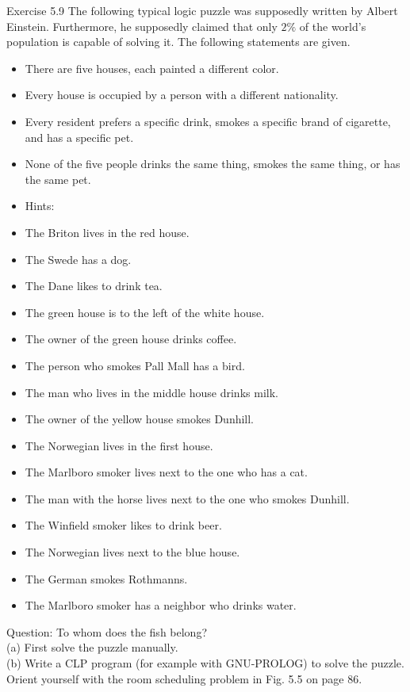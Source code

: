 \documentclass[10pt]{book}
\begin{document}
Exercise 5.9 The following typical logic puzzle was supposedly written by Albert Einstein. Furthermore, he supposedly claimed that only $2 \%$ of the world's population is capable of solving it. The following statements are given.

\begin{itemize}
  \item There are five houses, each painted a different color.
  \item Every house is occupied by a person with a different nationality.
  \item Every resident prefers a specific drink, smokes a specific brand of cigarette, and has a specific pet.
  \item None of the five people drinks the same thing, smokes the same thing, or has the same pet.
  \item Hints:
  \item The Briton lives in the red house.
  \item The Swede has a dog.
  \item The Dane likes to drink tea.
  \item The green house is to the left of the white house.
  \item The owner of the green house drinks coffee.
  \item The person who smokes Pall Mall has a bird.
  \item The man who lives in the middle house drinks milk.
  \item The owner of the yellow house smokes Dunhill.
  \item The Norwegian lives in the first house.
  \item The Marlboro smoker lives next to the one who has a cat.
  \item The man with the horse lives next to the one who smokes Dunhill.
  \item The Winfield smoker likes to drink beer.
  \item The Norwegian lives next to the blue house.
  \item The German smokes Rothmanns.
  \item The Marlboro smoker has a neighbor who drinks water.
\end{itemize}


Question: To whom does the fish belong?\\
(a) First solve the puzzle manually.\\
(b) Write a CLP program (for example with GNU-PROLOG) to solve the puzzle. Orient yourself with the room scheduling problem in Fig. 5.5 on page 86.
\end{document}
